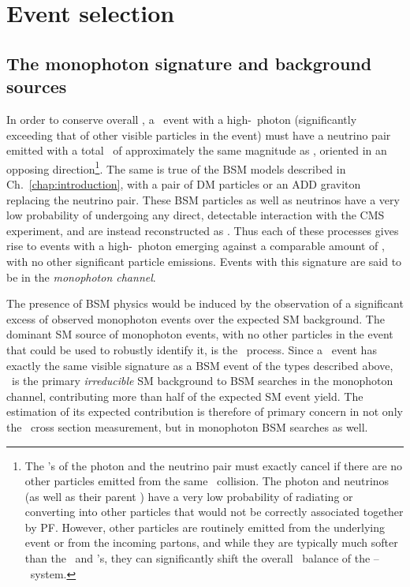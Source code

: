 \chapter{Event selection} \label{chap:event_selection}
\section{The monophoton signature and background sources} \label{sec:event_selection_backgrounds}
In order to conserve overall \pT, a \zinvg\ event with a high-\pT\ photon (significantly exceeding that of other visible particles in the event)
must have a neutrino pair emitted with a total \vecpT\ of approximately the same magnitude as \vecpTgamma, oriented in an opposing direction\footnote{The \pT's
of the photon and the neutrino pair must exactly cancel if there are no other particles emitted from the same \Pp\Pp\ collision. The photon and neutrinos (as well as
their parent \PZ) have a very low probability of radiating or converting into other particles that would not be correctly associated together by PF.
However, other particles are routinely emitted from the underlying event or from the incoming partons, and while they are typically much softer than the \Pgamma\ and
\Pn's, they can significantly shift the overall \pT\ balance of the \Pgamma--\Pn\Pn\ system.}.
The same is true of the BSM models described in Ch.~\ref{chap:introduction}, with a pair of DM particles or an ADD graviton replacing the neutrino pair.
These BSM particles as well as neutrinos have a very low probability of undergoing any direct, detectable interaction with the CMS experiment, and are instead reconstructed as \MET.
Thus each of these processes gives rise to events with a high-\pT\ photon emerging against a comparable amount of \MET, with no other significant particle emissions.
Events with this signature are said to be in the \textit{monophoton channel}.

The presence of BSM physics would be induced by the observation of a significant excess of observed monophoton events over the expected SM background.
The dominant SM source of monophoton events, with no other particles in the event that could be used to robustly identify it, is the \zinvg\ process.
Since a \zinvg\ event has exactly the same visible signature as a BSM event of the types described above, \zinvg\ is the primary \textit{irreducible} SM background
to BSM searches in the monophoton channel, contributing more than half of the expected SM event yield. The estimation of its expected contribution is therefore of
primary concern in not only the \zinvg\ cross section measurement, but in monophoton BSM searches as well.

